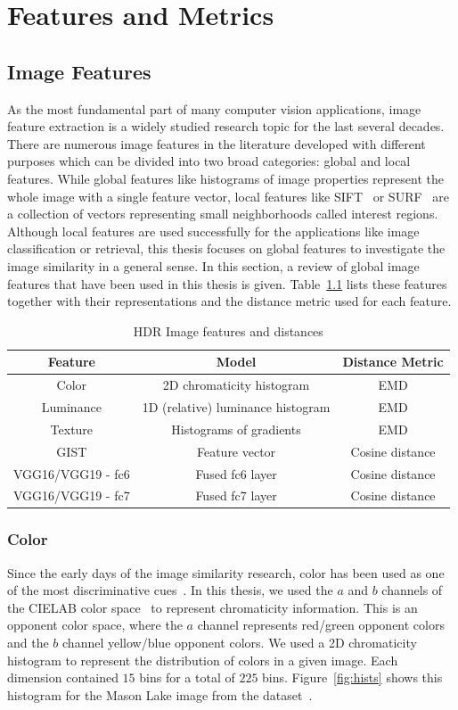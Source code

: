 \chapter{Features and Metrics}
\label{chp:b3}

\section{Image Features}
\label{sec:features}
As the most fundamental part of many computer vision applications, image feature extraction is a widely studied research topic for the last several decades. There are numerous image features in the literature developed with different purposes which can be divided into two broad categories: global and local features. While global features like histograms of image properties represent the whole image with a single feature vector, local features like SIFT~\cite{lowe2004distinctive} or SURF~\cite{bay2006surf} are a collection of vectors representing small neighborhoods called interest regions. Although local features are used successfully for the applications like image classification or retrieval, this thesis focuses on global features to investigate the image similarity in a general sense. In this section, a review of global image features that have been used in this thesis is given. Table~\ref{tab:table_feature} lists these features together with their representations and the distance metric used for each feature. 

\begin{table}
\caption{HDR Image features and distances}
\centering
\begin{tabular}{c|c|c}
\label{tab:table_feature}
\textbf{Feature} & \textbf{Model} & \textbf{Distance Metric}\\
\hline
Color  & 2D chromaticity histogram & EMD \\
Luminance  & 1D (relative) luminance histogram & EMD \\
Texture  & Histograms of gradients & EMD \\
GIST  & Feature vector & Cosine distance \\
VGG16/VGG19 - fc6 & Fused fc6 layer & Cosine distance  \\
VGG16/VGG19 - fc7 & Fused fc7 layer & Cosine distance
\end{tabular}
\end{table}

\subsection{Color}
Since the early days of the image similarity research, color has been used as one of the most discriminative cues~\cite{neumann2006image}. In this thesis,  we used the $a$ and $b$ channels of the CIELAB color space~\cite{iso201111664} to represent chromaticity information. This is an opponent color space, where the $a$ channel represents red/green opponent colors and the $b$ channel yellow/blue opponent colors. We used a 2D chromaticity histogram to represent the distribution of colors in a given image. Each dimension contained $15$ bins for a total of $225$ bins. Figure~\ref{fig:hists} shows this histogram for the Mason Lake image from the dataset~\cite{fairchild2007hdr}.

